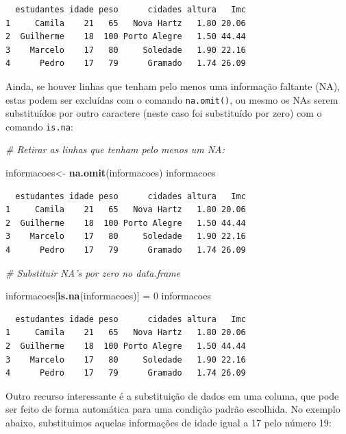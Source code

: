 \documentclass[12pt,brazil,oneside]{book}
\newenvironment{Shaded}{\begin{snugshade}}{\end{snugshade}}
\newcommand{\CommentTok}[1]{\textcolor[rgb]{0.56,0.35,0.01}{\textit{#1}}}
\newcommand{\DecValTok}[1]{\textcolor[rgb]{0.00,0.00,0.81}{#1}}
\newcommand{\KeywordTok}[1]{\textcolor[rgb]{0.13,0.29,0.53}{\textbf{#1}}}
\newcommand{\NormalTok}[1]{#1}
\newcommand{\StringTok}[1]{\textcolor[rgb]{0.31,0.60,0.02}{#1}}
\begin{document}
\begin{verbatim}
  estudantes idade peso      cidades altura   Imc
1     Camila    21   65   Nova Hartz   1.80 20.06
2  Guilherme    18  100 Porto Alegre   1.50 44.44
3    Marcelo    17   80     Soledade   1.90 22.16
4      Pedro    17   79      Gramado   1.74 26.09
\end{verbatim}

Ainda, se houver linhas que tenham pelo menos uma informação faltante
(NA), estas podem ser excluídas com o comando \texttt{na.omit()}, ou
mesmo os NAs serem substituídos por outro caractere (neste caso foi
substituído por zero) com o comando \texttt{is.na}:

\begin{Shaded}
\begin{Highlighting}[]
\CommentTok{# Retirar as linhas que tenham pelo menos um NA:}

\NormalTok{informacoes<-}\StringTok{ }\KeywordTok{na.omit}\NormalTok{(informacoes)}
\NormalTok{informacoes}
\end{Highlighting}
\end{Shaded}

\begin{verbatim}
  estudantes idade peso      cidades altura   Imc
1     Camila    21   65   Nova Hartz   1.80 20.06
2  Guilherme    18  100 Porto Alegre   1.50 44.44
3    Marcelo    17   80     Soledade   1.90 22.16
4      Pedro    17   79      Gramado   1.74 26.09
\end{verbatim}

\begin{Shaded}
\begin{Highlighting}[]
\CommentTok{# Substituir NA's por zero no data.frame}

\NormalTok{informacoes[}\KeywordTok{is.na}\NormalTok{(informacoes)] =}\StringTok{ }\DecValTok{0}
\NormalTok{informacoes}
\end{Highlighting}
\end{Shaded}

\begin{verbatim}
  estudantes idade peso      cidades altura   Imc
1     Camila    21   65   Nova Hartz   1.80 20.06
2  Guilherme    18  100 Porto Alegre   1.50 44.44
3    Marcelo    17   80     Soledade   1.90 22.16
4      Pedro    17   79      Gramado   1.74 26.09
\end{verbatim}

Outro recurso interessante é a substituição de dados em uma columa, que
pode ser feito de forma automática para uma condição padrão escolhida.
No exemplo abaixo, substituimos aquelas informações de idade igual a 17
pelo número 19:
\end{document}
